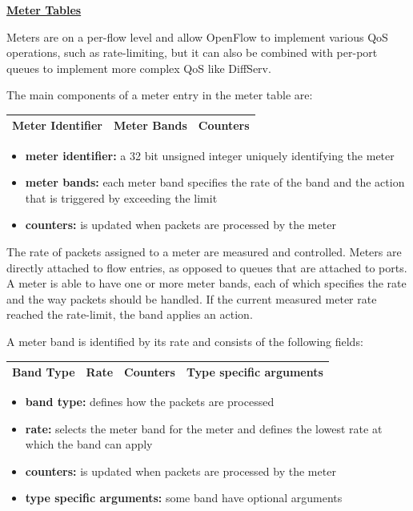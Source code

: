 \underline{\textbf{Meter Tables}}

Meters are on a per-flow level and allow OpenFlow to implement various QoS operations, such as rate-limiting, but it can also be combined with per-port queues to implement more complex QoS like DiffServ.

The main components of a meter entry in the meter table are:

\begin{center}
\begin{tabular}{|c|c|c|}
\hline Meter Identifier & Meter Bands & Counters \\ 
\hline 
\end{tabular} 
\end{center}

\begin{itemize}
\item \textbf{meter identifier:} a 32 bit unsigned integer uniquely identifying the meter
\item \textbf{meter bands:} each meter band specifies the rate of the band and the action that is triggered by exceeding the limit
\item \textbf{counters:} is updated when packets are processed by the meter
\end{itemize}

The rate of packets assigned to a meter are measured and controlled. Meters are directly attached to flow entries, as opposed to queues that are attached to ports. A meter is able to have one or more meter bands, each of which specifies the rate and the way packets should be handled. If the current measured meter rate reached the rate-limit, the band applies an action. 

A meter band is identified by its rate and consists of the following fields:

\begin{center}
\begin{tabular}{|c|c|c|c|}
\hline Band Type & Rate & Counters & Type specific arguments \\ 
\hline 
\end{tabular} 
\end{center}

\begin{itemize}
\item \textbf{band type:} defines how the packets are processed
\item \textbf{rate:} selects the meter band for the meter and defines the lowest rate at which the band can apply
\item \textbf{counters:} is updated when packets are processed by the meter
\item \textbf{type specific arguments:} some band have optional arguments
\end{itemize}


